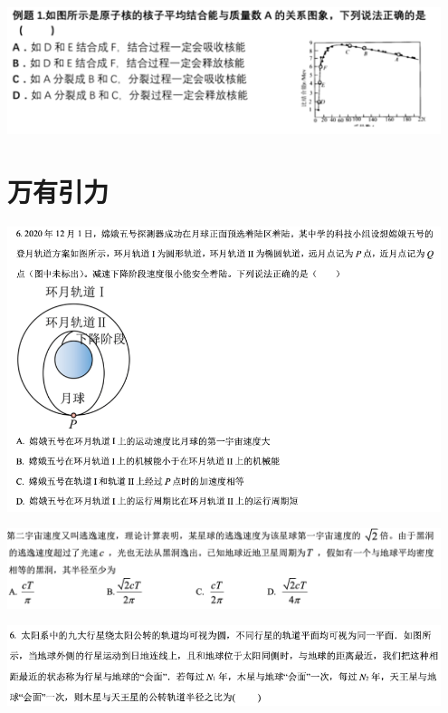 \documentclass{article}
\begin{document}
\includegraphics[width = 0.95\textwidth]{./pictures/4.png}

\vspace{5em}

\section{万有引力}
\includegraphics[width = 0.95\textwidth]{./pictures/5.png}

\vspace{5em}

\includegraphics[width = 0.95\textwidth]{./pictures/6.png}

\vspace{5em}

\includegraphics[width = 0.95\textwidth]{./pictures/7-1.png}
\end{document}
